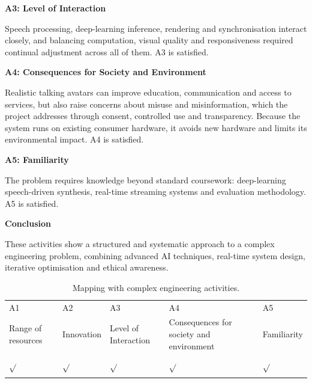 \vspace{0.5em}

\noindent
\textbf{A3: Level of Interaction}

\noindent
Speech processing, deep-learning inference, rendering and synchronisation interact closely, and balancing computation, visual quality and responsiveness required continual adjustment across all of them. A3 is satisfied.

\vspace{0.5em}

\noindent
\textbf{A4: Consequences for Society and Environment}

\noindent
Realistic talking avatars can improve education, communication and access to services, but also raise concerns about misuse and misinformation, which the project addresses through consent, controlled use and transparency. Because the system runs on existing consumer hardware, it avoids new hardware and limits its environmental impact. A4 is satisfied.

\vspace{0.5em}

\noindent
\textbf{A5: Familiarity}

\noindent
The problem requires knowledge beyond standard coursework: deep-learning speech-driven synthesis, real-time streaming systems and evaluation methodology. A5 is satisfied.

\vspace{0.8em}

\noindent
\textbf{Conclusion}

\noindent
These activities show a structured and systematic approach to a complex engineering problem, combining advanced AI techniques, real-time system design, iterative optimisation and ethical awareness.




\begin{center}
    \begin{table}[ht]
        \centering
                \caption{Mapping with complex engineering activities.}

        \begin{tabular}{|p{}|p{}|p{}|p{}|p{}|}
        \hline
        A1& A2& A3& A4& A5\\
        Range of resources & Innovation & Level of Interaction & Consequences for society and environment & Familiarity\\
        \hline
        $\sqrt{}$ & $\sqrt{}$ & $\sqrt{}$ & $\sqrt{}$ & $\sqrt{}$\\
        &&&&\\
        \hline
        \end{tabular}
        \label{tab:e_act}
    \end{table}
\end{center}


